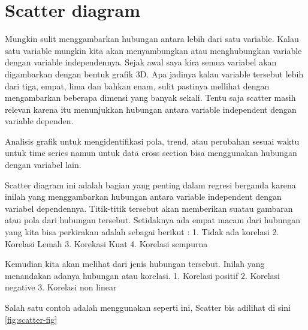 \documentclass[
]{book}
\newenvironment{Shaded}{\begin{snugshade}}{\end{snugshade}}
\newcommand{\AttributeTok}[1]{\textcolor[rgb]{0.13,0.29,0.53}{#1}}
\newcommand{\DecValTok}[1]{\textcolor[rgb]{0.00,0.00,0.81}{#1}}
\newcommand{\FunctionTok}[1]{\textcolor[rgb]{0.13,0.29,0.53}{\textbf{#1}}}
\newcommand{\NormalTok}[1]{#1}
\newcommand{\OtherTok}[1]{\textcolor[rgb]{0.56,0.35,0.01}{#1}}
\newcommand{\SpecialCharTok}[1]{\textcolor[rgb]{0.81,0.36,0.00}{\textbf{#1}}}
\newcommand{\StringTok}[1]{\textcolor[rgb]{0.31,0.60,0.02}{#1}}
\theoremstyle{definition}
\theoremstyle{definition}
\theoremstyle{definition}
\theoremstyle{definition}
\theoremstyle{remark}
\begin{document}
\hypertarget{scatter-diagram}{%
\section{Scatter diagram}\label{scatter-diagram}}

Mungkin sulit menggambarkan hubungan antara lebih dari satu variable. Kalau satu variable mungkin kita akan menyambungkan atau menghubungkan variable dengan variable independennya. Sejak awal saya kira semua variabel akan digambarkan dengan bentuk grafik 3D. Apa jadinya kalau variable tersebut lebih dari tiga, empat, lima dan bahkan enam, sulit pastinya mellihat dengan mengambarkan beberapa dimensi yang banyak sekali. Tentu saja scatter masih relevan karena itu menunjukkan hubungan antara variable independent dengan variable dependen.

Analisis grafik untuk mengidentifikasi pola, trend, atau perubahan sesuai waktu untuk time series namun untuk data cross section bisa menggunakan hubungan dengan variabel lain.

Scatter diagram ini adalah bagian yang penting dalam regresi berganda karena inilah yang menggambarkan hubungan antara variable independent dengan variabel dependennya. Titik-titik tersebut akan memberikan suatau gambaran atau pola dari hubungan tersebut. Setidaknya ada empat macam dari hubungan yang kita bisa perkirakan adalah sebagai berikut :
1. Tidak ada korelasi
2. Korelasi Lemah
3. Korekasi Kuat
4. Korelasi sempurna

Kemudian kita akan melihat dari jenis hubungan tersebut. Inilah yang menandakan adanya hubungan atau korelasi.
1. Korelasi positif
2. Korelasi negative
3. Korelasi non linear

Salah satu contoh adalah menggunakan seperti ini, Scatter bis adilihat di sini \ref{fig:scatter-fig}

\begin{Shaded}
\end{Shaded}
\end{document}
